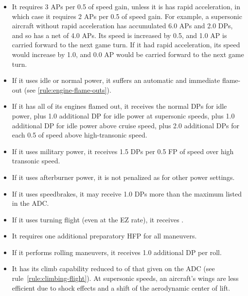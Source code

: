 \begin{advancedrules}
{\begin{itemize}
   \item It requires 3 APs per 0.5 of speed gain, unless it is has rapid acceleration, in which case it requires 2 APs per 0.5 of speed gain. For example, a supersonic aircraft without rapid acceleration has accumulated 6.0 APs and 2.0 DPs, and so has a net of 4.0 APs. Its speed is increased by 0.5, and 1.0 AP is carried forward to the next game turn. If it had rapid acceleration, its speed would increase by 1.0, and 0.0 AP would be carried forward to the next game turn.

    \item If it uses idle or normal power, it suffers an automatic and immediate flame-out (see \ref{rule:engine-flame-outs}).

    \item If it has all of its engines flamed out, it receives the normal DPs for idle power, plus 1.0 additional DP for idle power at supersonic speeds, plus 1.0 additional DP for idle power above cruise speed, plus 2.0 additional DPs for each 0.5 of speed above high-transonic speed.
   
    \item If it uses military power, it receives 1.5 DPs per 0.5 FP of speed over high transonic speed.

    \item If it uses afterburner power, it is not penalized as for other power settings.

    \item If it uses speedbrakes, it may receive 1.0 DPs more than the maximum listed in the ADC.

    \item If it uses turning flight (even at the EZ rate), it receives .

    \item It requires one additional preparatory HFP for all maneuvers. 

    \item If it performs rolling maneuvers, it receives 1.0 additional DP per roll.

    \item It has its climb capability reduced to {\twothirds} of that given on the ADC (see rule~\ref{rule:climbing-flight}). At supersonic speeds, an aircraft's wings are less efficient due to shock effects and a shift of the aerodynamic center of lift.

\end{itemize}
}
\end{advancedrules}
